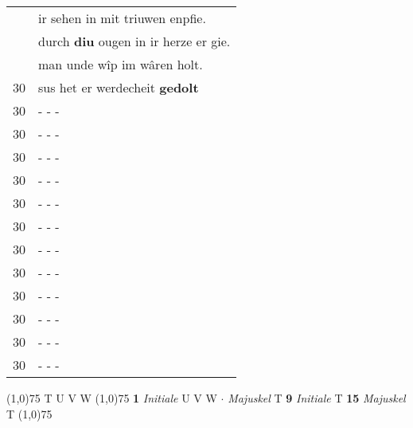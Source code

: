 \documentclass[8pt,a4paper,notitlepage]{article}
\begin{document}
\begin{table}[ht]
\begin{minipage}[t]{0.5\linewidth}
\begin{tabular}{rl}
 & ir sehen in mit triuwen enpfie.\\ 
 & durch \textbf{diu} ougen in ir herze er gie.\\ 
 & man unde wîp im wâren holt.\\ 
30 & sus het er werdecheit \textbf{gedolt}\\ 
30 & \multicolumn{1}{l}{ - - - }\\ 
30 & \multicolumn{1}{l}{ - - - }\\ 
30 & \multicolumn{1}{l}{ - - - }\\ 
30 & \multicolumn{1}{l}{ - - - }\\ 
30 & \multicolumn{1}{l}{ - - - }\\ 
30 & \multicolumn{1}{l}{ - - - }\\ 
30 & \multicolumn{1}{l}{ - - - }\\ 
30 & \multicolumn{1}{l}{ - - - }\\ 
30 & \multicolumn{1}{l}{ - - - }\\ 
30 & \multicolumn{1}{l}{ - - - }\\ 
30 & \multicolumn{1}{l}{ - - - }\\ 
30 & \multicolumn{1}{l}{ - - - }\\ 
\end{tabular}
\scriptsize
\line(1,0){75} \newline
T U V W \newline
\line(1,0){75} \newline
\textbf{1} \textit{Initiale} U V W   $\cdot$ \textit{Majuskel} T  \textbf{9} \textit{Initiale} T  \textbf{15} \textit{Majuskel} T  \newline
\line(1,0){75} \newline

\end{minipage}
\end{table}
\end{document}
